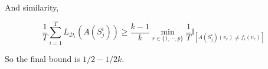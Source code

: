 \documentclass{article}
\begin{document}
\begin{itemize}
\begin{itemize}
And similarity,

	\begin{equation*}
	\frac{1}{T}\sum_{i=1}^T L_{\mathcal{D}_i} (A(S_j^i))\geq\frac{k-1}{k}\min_{r\in\{1,\cdots,p\}}\frac{1}{T}\mathbb{I}_{[A(S^i_j)(v_r)\neq f_i(v_r)]}
	\end{equation*}
	
	So the final bound is $1/2-1/2k$.
\end{itemize} 

\end{itemize}
\end{document}

